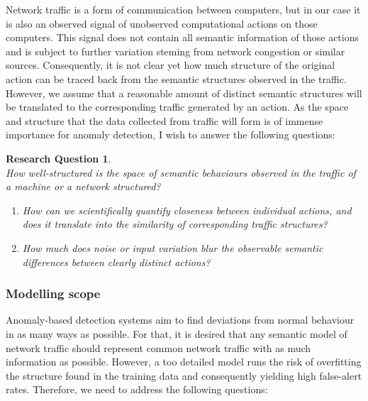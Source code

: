 \documentclass[a4paper,12pt,twoside]{report}
\newtheorem{rquestion}{Research Question}
\begin{document}
Network traffic is a form of communication between computers, but in our case it is also an observed signal of unobserved computational actions on those computers. This signal does not contain all semantic information of those actions and is subject to further variation steming from network congestion or similar sources. Consequently, it is not clear yet how  much structure of the original action can be traced back from the semantic structures observed in the traffic. However, we assume that a reasonable amount of distinct semantic structures will be translated to the corresponding traffic generated by an action. As the space and structure that the data collected from traffic will form is of immense importance for anomaly detection, I wish to answer the following questions:

\begin{rquestion}\ \\ 
How well-structured is the space of semantic behaviours observed in the traffic of a machine or a network structured? 
\begin{enumerate}
\item How can we scientifically quantify closeness between individual actions, and does it translate into the similarity of corresponding traffic structures? 
\item How much does noise or input variation blur the observable semantic differences between clearly distinct actions?
\end{enumerate}
\end{rquestion}

\subsubsection{Modelling scope}

Anomaly-based detection systems aim to find deviations from normal behaviour in as many ways as possible. For that, it is desired that any semantic model of network traffic should represent common network traffic with as much information as possible. However, a too detailed model runs the risk of overfitting the structure found in the training data and consequently yielding high false-alert rates. Therefore, we need to address the following questions: 
\end{document}
